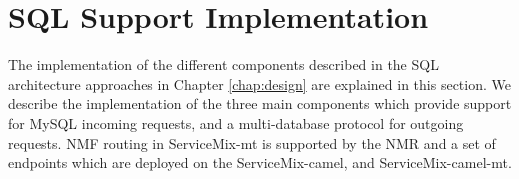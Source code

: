 \section{SQL Support Implementation}
\label{sec:implementationsql}

The implementation of the different components described in the \ac{SQL} architecture approaches in Chapter \ref{chap:design} are explained in this section. We describe the implementation of the three main components which provide support for MySQL incoming requests, and a multi-database protocol for outgoing requests. \ac{NMF} routing in ServiceMix-mt is supported by the \ac{NMR} and a set of endpoints which are deployed on the ServiceMix-camel, and ServiceMix-camel-mt. 





